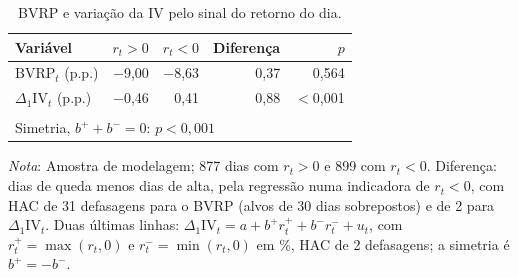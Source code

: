 \begin{table}[H]
\centering
\small
\caption{BVRP e variação da IV pelo sinal do retorno do dia.}
\label{tab:retnl-sinal}
\begin{tabular}{lrrrr}
\toprule
Variável & $r_t > 0$ & $r_t < 0$ & Diferença & $p$ \\
\midrule
$\text{BVRP}_t$ (p.p.) & $-$9{,}00 & $-$8{,}63 & 0{,}37 & 0{,}564 \\
$\Delta_1\text{IV}_t$ (p.p.) & $-$0{,}46 & 0{,}41 & 0{,}88 & $<$0{,}001 \\
\addlinespace
\multicolumn{5}{l}{$\Delta_1\text{IV}_t$ sobre $r_t^+$ e $r_t^-$: $\hat b^+ = 0{,}005$ ($p = 0{,}958$); $\hat b^- = -0{,}772$ ($p < 0{,}001$)} \\
\multicolumn{5}{l}{Simetria, $b^+ + b^- = 0$: $p < 0{,}001$} \\
\bottomrule
\end{tabular}
\par\smallskip
\parbox{0.95\linewidth}{\footnotesize\textit{Nota}: Amostra de modelagem; 877 dias com $r_t > 0$ e 899 com $r_t < 0$. Diferença: dias de queda menos dias de alta, pela regressão numa indicadora de $r_t < 0$, com HAC de 31 defasagens para o BVRP (alvos de 30 dias sobrepostos) e de 2 para $\Delta_1\text{IV}_t$. Duas últimas linhas: $\Delta_1\text{IV}_t = a + b^+ r_t^+ + b^- r_t^- + u_t$, com $r_t^+ = \max(r_t, 0)$ e $r_t^- = \min(r_t, 0)$ em \%, HAC de 2 defasagens; a simetria é $b^+ = -b^-$.}
\end{table}
